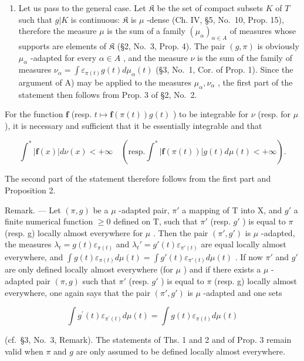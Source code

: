 \begin{enumerate}
\def\labelenumi{\Alph{enumi})}
\setcounter{enumi}{1}
\tightlist
\item
  Let us pass to the general case. Let \(\mathfrak{K}\) be the set of compact subsets \(K\) of \(T\) such that \(g|K\) is continuous: \(\mathfrak{K}\) is \(\mu\) -dense (Ch. IV, §5, No.~10, Prop. 15), therefore the measure \(\mu\) is the sum of a family \((\mu_{\alpha})_{\alpha \in A}\) of measures whose supports are elements of \(\mathfrak{K}\) (§2, No.~3, Prop. 4). The pair \((g,\pi)\) is obviously \(\mu_{\alpha}\) -adapted for every \(\alpha \in A\) , and the measure \(\nu\) is the sum of the family of measures \(\nu_{\alpha} = \int \varepsilon_{\pi(t)} g(t) d\mu_{\alpha}(t)\) (§3, No.~1, Cor. of Prop. 1). Since the argument of A) may be applied to the measures \(\mu_{\alpha}, \nu_{\alpha}\) , the first part of the statement then follows from Prop. 3 of §2, No.~2.
\end{enumerate}

For the function \(\mathbf{f}\) (resp. \(t\mapsto \mathbf{f}(\pi (t))g(t)\) ) to be integrable for \(\nu\) (resp. for \(\mu\) ), it is necessary and sufficient that it be essentially integrable and that

\[
\int^ {*} | \mathbf {f} (x) | d \nu (x) <   + \infty \quad (\mathrm{resp.} \int^ {*} | \mathbf {f} (\pi (t)) | g (t) d \mu (t) <   + \infty).
\]

The second part of the statement therefore follows from the first part and Proposition 2.

Remark. --- Let \((\pi, g)\) be a \(\mu\) -adapted pair, \(\pi'\) a mapping of T into X, and \(g'\) a finite numerical function \(\geqslant 0\) defined on T, such that \(\pi'\) (resp. \(g'\) ) is equal to \(\pi\) (resp. g) locally almost everywhere for \(\mu\) . Then the pair \((\pi', g')\) is \(\mu\) -adapted, the measures \(\lambda_t = g(t)\varepsilon_{\pi(t)}\) and \(\lambda_t' = g'(t)\varepsilon_{\pi'(t)}\) are equal locally almost everywhere, and \(\int g(t)\varepsilon_{\pi(t)} d\mu(t) = \int g'(t)\varepsilon_{\pi'(t)} d\mu(t)\) . If now \(\pi'\) and \(g'\) are only defined locally almost everywhere (for \(\mu\) ) and if there exists a \(\mu\) -adapted pair \((\pi, g)\) such that \(\pi'\) (resp. \(g'\) ) is equal to \(\pi\) (resp. g) locally almost everywhere, one again says that the pair \((\pi', g')\) is \(\mu\) -adapted and one sets

\[
\int g ^ {\prime} (t) \varepsilon_ {\pi^ {\prime} (t)} d \mu (t) = \int g (t) \varepsilon_ {\pi (t)} d \mu (t)
\]

(cf.~§3, No.~3, Remark). The statements of Ths. 1 and 2 and of Prop. 3 remain valid when \(\pi\) and \(g\) are only assumed to be defined locally almost everywhere.

